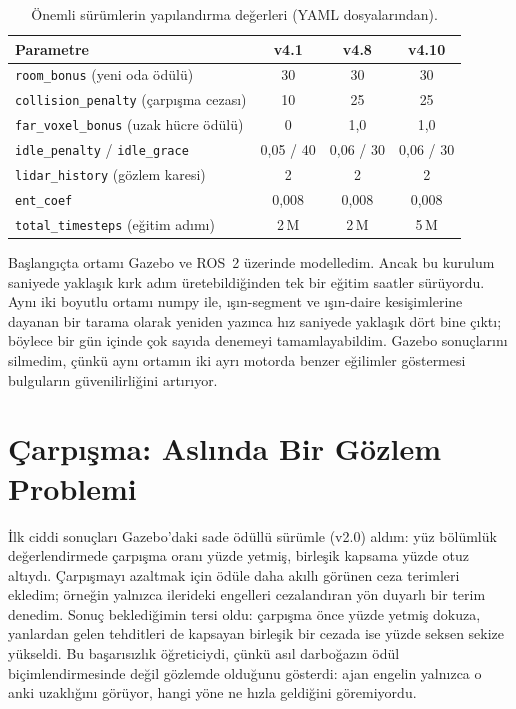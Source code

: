 \documentclass[11pt,a4paper]{article}
\begin{document}
\begin{table}[H]
\centering
\caption{Önemli sürümlerin yapılandırma değerleri (YAML dosyalarından).}
\label{tab:param}
\small
\begin{tabular}{lccc}
\toprule
Parametre & v4.1 & v4.8 & v4.10 \\
\midrule
\texttt{room\_bonus} (yeni oda ödülü) & 30 & 30 & 30 \\
\texttt{collision\_penalty} (çarpışma cezası) & 10 & 25 & 25 \\
\texttt{far\_voxel\_bonus} (uzak hücre ödülü) & 0 & 1{,}0 & 1{,}0 \\
\texttt{idle\_penalty} / \texttt{idle\_grace} & 0{,}05 / 40 & 0{,}06 / 30 & 0{,}06 / 30 \\
\texttt{lidar\_history} (gözlem karesi) & 2 & 2 & 2 \\
\texttt{ent\_coef} & 0{,}008 & 0{,}008 & 0{,}008 \\
\texttt{total\_timesteps} (eğitim adımı) & 2\,M & 2\,M & 5\,M \\
\bottomrule
\end{tabular}
\end{table}

Başlangıçta ortamı Gazebo ve ROS~2 üzerinde modelledim. Ancak bu kurulum saniyede yaklaşık kırk
adım üretebildiğinden tek bir eğitim saatler sürüyordu. Aynı iki boyutlu ortamı numpy ile, ışın-segment
ve ışın-daire kesişimlerine dayanan bir tarama olarak yeniden yazınca hız saniyede yaklaşık dört bine
çıktı; böylece bir gün içinde çok sayıda denemeyi tamamlayabildim. Gazebo sonuçlarını silmedim,
çünkü aynı ortamın iki ayrı motorda benzer eğilimler göstermesi bulguların güvenilirliğini artırıyor.

\section{Çarpışma: Aslında Bir Gözlem Problemi}

İlk ciddi sonuçları Gazebo'daki sade ödüllü sürümle (v2.0) aldım: yüz bölümlük değerlendirmede
çarpışma oranı yüzde yetmiş, birleşik kapsama yüzde otuz altıydı. Çarpışmayı azaltmak için ödüle
daha akıllı görünen ceza terimleri ekledim; örneğin yalnızca ilerideki engelleri cezalandıran
yön duyarlı bir terim denedim. Sonuç beklediğimin tersi oldu: çarpışma önce yüzde yetmiş dokuza,
yanlardan gelen tehditleri de kapsayan birleşik bir cezada ise yüzde seksen sekize yükseldi. Bu
başarısızlık öğreticiydi, çünkü asıl darboğazın ödül biçimlendirmesinde değil gözlemde olduğunu
gösterdi: ajan engelin yalnızca o anki uzaklığını görüyor, hangi yöne ne hızla geldiğini
göremiyordu.
\end{document}
